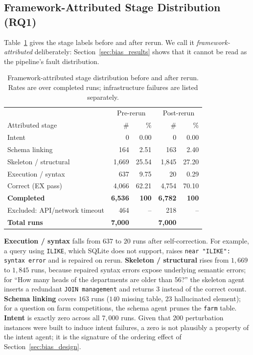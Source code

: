 \documentclass{llncs}
\begin{document}
\subsection{Framework-Attributed Stage Distribution (RQ1)}
\label{sec:failure_dist}

Table~\ref{tab:failures} gives the stage labels before and after rerun. We call
it \emph{framework-attributed} deliberately: Section~\ref{sec:bias_results}
shows that it cannot be read as the pipeline's fault distribution.

\begin{table}[t]
\centering
\caption{Framework-attributed stage distribution before and after rerun. Rates
are over completed runs; infrastructure failures are listed separately.}
\label{tab:failures}
\small
\begin{tabular}{lrrrr}
\toprule
& \multicolumn{2}{c}{Pre-rerun} & \multicolumn{2}{c}{Post-rerun} \\
Attributed stage & \# & \% & \# & \% \\
\midrule
Intent                 & 0       & 0.00  & 0       & 0.00 \\
Schema linking         & 164     & 2.51  & 163     & 2.40 \\
Skeleton / structural  & 1{,}669 & 25.54 & 1{,}845 & 27.20 \\
Execution / syntax     & 637     & 9.75  & 20      & 0.29 \\
Correct (EX pass)      & 4{,}066 & 62.21 & 4{,}754 & 70.10 \\
\midrule
\textbf{Completed}     & \textbf{6{,}536} & \textbf{100} & \textbf{6{,}782} & \textbf{100} \\
Excluded: API/network timeout & 464 & -- & 218 & -- \\
\textbf{Total runs}    & \textbf{7{,}000} & & \textbf{7{,}000} & \\
\bottomrule
\end{tabular}
\end{table}

\noindent\textbf{Execution / syntax} falls from $637$ to $20$ runs after
self-correction. For example, a query using \texttt{ILIKE}, which SQLite does
not support, raises \texttt{near "ILIKE": syntax error} and is repaired on
rerun. \textbf{Skeleton / structural} rises from $1{,}669$ to $1{,}845$ runs,
because repaired syntax errors expose underlying semantic errors; for ``How
many heads of the departments are older than 56?'' the skeleton agent inserts
a redundant \texttt{JOIN management} and returns 3 instead of the correct
count. \textbf{Schema linking} covers $163$ runs ($140$ missing table, $23$
hallucinated element); for a question on farm competitions, the schema agent
prunes the \texttt{farm} table. \textbf{Intent} is exactly zero across all
$7{,}000$ runs. Given that $200$ perturbation instances were built to induce
intent failures, a zero is not plausibly a property of the intent agent; it is
the signature of the ordering effect of Section~\ref{sec:bias_design}.
\end{document}
